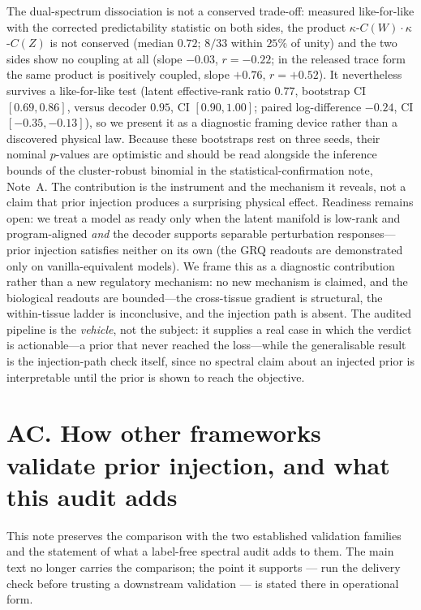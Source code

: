 \documentclass[11 pt,a4 paper]{article}
\begin{document}
The dual-spectrum dissociation is not a conserved trade-off: measured like-for-like with the corrected predictability statistic on both sides, the product $\kappa$-$C(W)\cdot\kappa$-$C(Z)$ is not conserved (median $0.72$; $8/33$ within $25\%$ of unity) and the two sides show no coupling at all (slope $-0.03$, $r=-0.22$; in the released trace form the same product is positively coupled, slope $+0.76$, $r=+0.52$). It nevertheless survives a like-for-like test (latent effective-rank ratio $0.77$, bootstrap CI $[0.69,0.86]$, versus decoder $0.95$, CI $[0.90,1.00]$; paired log-difference $-0.24$, CI $[-0.35,-0.13]$), so we present it as a diagnostic framing device rather than a discovered physical law. Because these bootstraps rest on three seeds, their nominal $p$-values are optimistic and should be read alongside the inference bounds of the cluster-robust binomial in the statistical-confirmation note, Note~A. The contribution is the instrument and the mechanism it reveals, not a claim that prior injection produces a surprising physical effect. Readiness remains open: we treat a model as ready only when the latent manifold is low-rank and program-aligned \emph{and} the decoder supports separable perturbation responses---prior injection satisfies neither on its own (the GRQ readouts are demonstrated only on vanilla-equivalent models). We frame this as a diagnostic contribution rather than a new regulatory mechanism: no new mechanism is claimed, and the biological readouts are bounded---the cross-tissue gradient is structural, the within-tissue ladder is inconclusive, and the injection path is absent. The audited pipeline is the \emph{vehicle}, not the subject: it supplies a real case in which the verdict is actionable---a prior that never reached the loss---while the generalisable result is the injection-path check itself, since no spectral claim about an injected prior is interpretable until the prior is shown to reach the objective.

\clearpage

\section*{AC. How other frameworks validate prior injection, and what this audit adds}

This note preserves the comparison with the two established validation families and the
statement of what a label-free spectral audit adds to them. The main text no longer carries the
comparison; the point it supports --- run the delivery check before trusting a downstream
validation --- is stated there in operational form.
\end{document}
